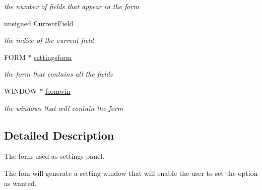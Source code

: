 \begin{DoxyCompactItemize}
\begin{DoxyCompactList}\small\item\em the number of fields that appear in the form \end{DoxyCompactList}\item 
\hypertarget{class_c_form_adf3211c9b2d6cfb98d1d1670127abf8d}{unsigned \hyperlink{class_c_form_adf3211c9b2d6cfb98d1d1670127abf8d}{Current\-Field}}\label{class_c_form_adf3211c9b2d6cfb98d1d1670127abf8d}

\begin{DoxyCompactList}\small\item\em the indice of the current field \end{DoxyCompactList}\item 
\hypertarget{class_c_form_a47d9255ecad93a3d6e3e9ada49293d33}{F\-O\-R\-M $\ast$ \hyperlink{class_c_form_a47d9255ecad93a3d6e3e9ada49293d33}{settingsform}}\label{class_c_form_a47d9255ecad93a3d6e3e9ada49293d33}

\begin{DoxyCompactList}\small\item\em the form that contains all the fields \end{DoxyCompactList}\item 
\hypertarget{class_c_form_aa2610e56233b291cca05f56d2d7991ce}{W\-I\-N\-D\-O\-W $\ast$ \hyperlink{class_c_form_aa2610e56233b291cca05f56d2d7991ce}{formwin}}\label{class_c_form_aa2610e56233b291cca05f56d2d7991ce}

\begin{DoxyCompactList}\small\item\em the windows that will contain the form \end{DoxyCompactList}\end{DoxyCompactItemize}


\subsection{Detailed Description}
The form used as settings panel. 

The fom will generate a setting window that will enable the user to set the option as wanted. 

